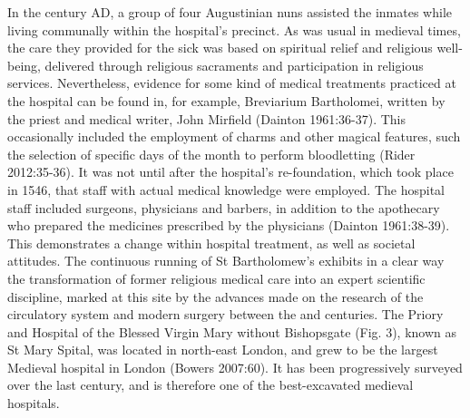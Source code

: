 \documentclass[%
	]{ijsra}
\begin{document}
In the  century AD, a group of four Augustinian nuns assisted the inmates while living communally within the hospital’s precinct. As was usual in medieval times, the care they provided for the sick was based on spiritual relief and religious well-being, delivered through religious sacraments and participation in religious services. 
Nevertheless, evidence for some kind of medical treatments practiced at the hospital can be found in, for example, Breviarium Bartholomei, written by the priest and medical writer, John Mirfield (Dainton 1961:36-37). This occasionally included the employment of charms and other magical features, such the selection of specific days of the month to perform bloodletting (Rider 2012:35-36). It was not until after the hospital’s re-foundation, which took place in 1546, that staff with actual medical knowledge were employed. The hospital staff included surgeons, physicians and barbers, in addition to the apothecary who prepared the medicines prescribed by the physicians (Dainton 1961:38-39). This demonstrates a change within hospital treatment, as well as societal attitudes.  
The continuous running of St Bartholomew’s exhibits in a clear way the transformation of former religious medical care into an expert scientific discipline, marked at this site by the advances made on the research of the circulatory system and modern surgery between the  and  centuries.
\IJSRAseparator
{}
The Priory and Hospital of the Blessed Virgin Mary without Bishopsgate (Fig. 3), %
known as St Mary Spital, was located in north-east London, and grew to be the largest Medieval hospital in London (Bowers 2007:60). It has been progressively surveyed over the last century, and is therefore one of the best-excavated medieval hospitals. 
\end{document}
